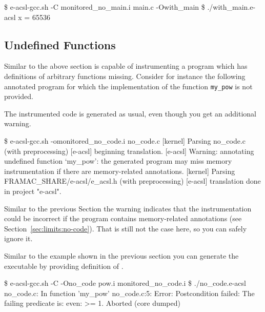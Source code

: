 
\begin{logs}
\$ e-acsl-gcc.sh -C monitored_no_main.i main.c -Owith_main
\$ ./with_main.e-acsl
x = 65536
\end{logs}


\subsection{Undefined Functions}
\label{sec:no-code}

Similar to the above section \eacsl is capable of instrumenting a program which
has definitions of arbitrary functions missing.  Consider for instance the
following annotated program for which the implementation of the function
\texttt{my\_pow} is not provided.


The instrumented code is generated as usual, even though you get an additional
warning.
\begin{logs}
\$ e-acsl-gcc.sh -omonitored_no_code.i no_code.c
[kernel] Parsing no_code.c (with preprocessing)
[e-acsl] beginning translation.
[e-acsl] Warning: annotating undefined function `my_pow':
  the generated program may miss memory instrumentation
  if there are memory-related annotations.
[kernel] Parsing FRAMAC_SHARE/e-acsl/e_acsl.h (with preprocessing)
[e-acsl] translation done in project "e-acsl".
\end{logs}

Similar to the previous Section the warning indicates that the instrumentation
could be incorrect if the program contains memory-related annotations (see
Section~\ref{sec:limits:no-code}). That is still not the case here, so you can
safely ignore it.


Similar to the example shown in the previous section you can generate the
executable by providing definition of .

\begin{logs}
\$ e-acsl-gcc.sh -C -Ono_code pow.i monitored_no_code.i
\$ ./no_code.e-acsl
no_code.c: In function 'my_pow'
no_code.c:5: Error: Postcondition failed:
        The failing predicate is:
        even: \result >= 1.
Aborted (core dumped)
\end{logs}

